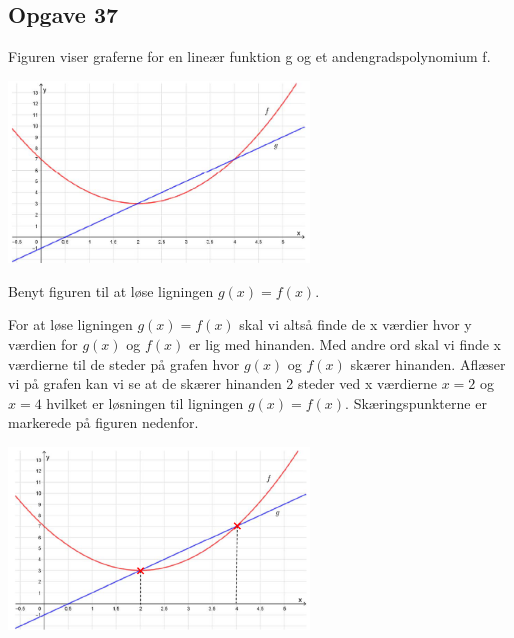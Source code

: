 \subsection{Opgave 37}

Figuren viser graferne for en lineær funktion g og et andengradspolynomium f.

\includegraphics[width=8cm]{Opgave_31-40/Opgave_37/37.png}

Benyt figuren til at løse ligningen $g(x) = f(x)$.


\ans

For at løse ligningen $g(x) = f(x)$ skal vi altså finde de x værdier hvor y værdien for $g(x)$ og $f(x)$ er lig med hinanden.
Med andre ord skal vi finde x værdierne til de steder på grafen hvor $g(x)$ og $f(x)$ skærer hinanden.
Aflæser vi på grafen kan vi se at de skærer hinanden 2 steder ved x værdierne $x = 2$ og $x = 4$ hvilket er løsningen til ligningen $g(x) = f(x)$.
Skæringspunkterne er markerede på figuren nedenfor.

\includegraphics[width=8cm]{Opgave_31-40/Opgave_37/37.1.png}